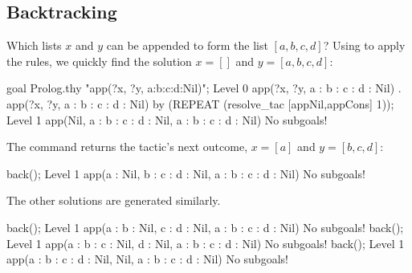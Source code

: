 \subsection{Backtracking}
Which lists $x$ and $y$ can be appended to form the list $[a,b,c,d]$?
Using  to apply the rules, we quickly find the solution
$x=[]$ and $y=[a,b,c,d]$:
\begin{ttbox}
goal Prolog.thy "app(?x, ?y, a:b:c:d:Nil)";
{\out Level 0}
{\out app(?x, ?y, a : b : c : d : Nil)}
{. app(?x, ?y, a : b : c : d : Nil)}
\ttbreak
by (REPEAT (resolve_tac [appNil,appCons] 1));
{\out Level 1}
{\out app(Nil, a : b : c : d : Nil, a : b : c : d : Nil)}
{\out No subgoals!}
\end{ttbox}
The  command returns the tactic's next outcome,
$x=[a]$ and $y=[b,c,d]$:
\begin{ttbox}
back();
{\out Level 1}
{\out app(a : Nil, b : c : d : Nil, a : b : c : d : Nil)}
{\out No subgoals!}
\end{ttbox}
The other solutions are generated similarly.
\begin{ttbox}
back();
{\out Level 1}
{\out app(a : b : Nil, c : d : Nil, a : b : c : d : Nil)}
{\out No subgoals!}
\ttbreak
back();
{\out Level 1}
{\out app(a : b : c : Nil, d : Nil, a : b : c : d : Nil)}
{\out No subgoals!}
\ttbreak
back();
{\out Level 1}
{\out app(a : b : c : d : Nil, Nil, a : b : c : d : Nil)}
{\out No subgoals!}
\end{ttbox}


